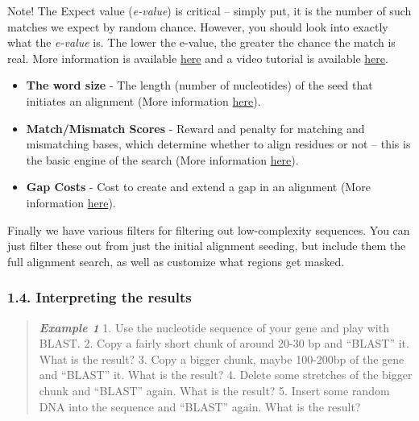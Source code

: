 \documentclass[]{article}
\begin{document}
Note! The Expect value (\emph{e-value}) is critical -- simply put, it is
the number of such matches we expect by random chance. However, you
should look into exactly what the \emph{e-value} is. The lower the
e-value, the greater the chance the match is real. More information is
available
\href{http://www.ncbi.nlm.nih.gov/BLAST/blastcgihelp.shtml\#expect}{here}
and a video tutorial is available
\href{https://www.youtube.com/watch?v=nO0wJgZRZJs}{here}.

\begin{itemize}
\itemsep1pt\parskip0pt
\item
  \textbf{The word size} - The length (number of nucleotides) of the
  seed that initiates an alignment (More information
  \href{http://www.ncbi.nlm.nih.gov/BLAST/blastcgihelp.shtml\#wordsize}{here}).
\item
  \textbf{Match/Mismatch Scores} - Reward and penalty for matching and
  mismatching bases, which determine whether to align residues or not --
  this is the basic engine of the search (More information
  \href{http://www.ncbi.nlm.nih.gov/BLAST/blastcgihelp.shtml\#Reward-penalty}{here}).
\item
  \textbf{Gap Costs} - Cost to create and extend a gap in an alignment
  (More information
  \href{http://www.ncbi.nlm.nih.gov/BLAST/blastcgihelp.shtml\#Reward-penalty}{here}).
\end{itemize}

Finally we have various filters for filtering out low-complexity
sequences. You can just filter these out from just the initial alignment
seeding, but include them the full alignment search, as well as
customize what regions get masked.

\subsubsection{1.4. Interpreting the
results}\label{interpreting-the-results}

\begin{quote}
\emph{\textbf{Example 1}} 1. Use the nucleotide sequence of your gene
and play with BLAST. 2. Copy a fairly short chunk of around 20-30 bp and
``BLAST'' it. What is the result? 3. Copy a bigger chunk, maybe
100-200bp of the gene and ``BLAST'' it. What is the result? 4. Delete
some stretches of the bigger chunk and ``BLAST'' again. What is the
result? 5. Insert some random DNA into the sequence and ``BLAST'' again.
What is the result?
\end{quote}
\end{document}

